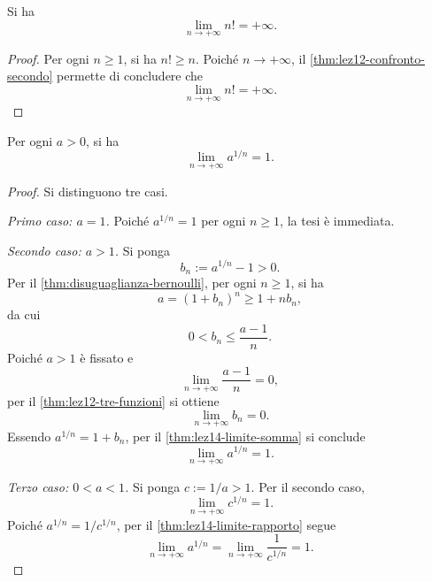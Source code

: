 \begin{proposition}
\label{prop:lez17-limite-fattoriale}
Si ha
\[
  \lim_{n\to+\infty}n!=+\infty.
\]
\end{proposition}

\begin{proof}
Per ogni \(n\ge1\), si ha \(n!\ge n\).
Poiché \(n\to+\infty\), il
\cref{thm:lez12-confronto-secondo} permette di concludere
che
\[
  \lim_{n\to+\infty}n!=+\infty.
\]
\end{proof}

\begin{proposition}
\label{prop:lez17-radici-en}
Per ogni \(a>0\), si ha
\[
  \lim_{n\to+\infty}a^{1/n}=1.
\]
\end{proposition}

\begin{proof}
Si distinguono tre casi.

\emph{Primo caso: \(a=1\).}
Poiché \(a^{1/n}=1\) per ogni \(n\ge1\),
la tesi è immediata.

\emph{Secondo caso: \(a>1\).}
Si ponga
\[
  b_n:=a^{1/n}-1>0.
\]
Per il \cref{thm:disuguaglianza-bernoulli},
per ogni \(n\ge1\), si ha
\[
  a=(1+b_n)^n\ge1+nb_n,
\]
da cui
\[
  0<b_n\le\frac{a-1}{n}.
\]
Poiché \(a>1\) è fissato e
\[
  \lim_{n\to+\infty}\frac{a-1}{n}=0,
\]
per il \cref{thm:lez12-tre-funzioni} si ottiene
\[
  \lim_{n\to+\infty}b_n=0.
\]
Essendo \(a^{1/n}=1+b_n\), per il
\cref{thm:lez14-limite-somma} si conclude
\[
  \lim_{n\to+\infty}a^{1/n}=1.
\]

\emph{Terzo caso: \(0<a<1\).}
Si ponga \(c:=1/a>1\). Per il secondo caso,
\[
  \lim_{n\to+\infty}c^{1/n}=1.
\]
Poiché \(a^{1/n}=1/c^{1/n}\), per il
\cref{thm:lez14-limite-rapporto} segue
\[
  \lim_{n\to+\infty}a^{1/n}
  =\lim_{n\to+\infty}\frac1{c^{1/n}}=1.
\]
\end{proof}
